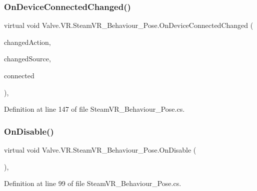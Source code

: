 \subsubsection{\texorpdfstring{OnDeviceConnectedChanged()}{OnDeviceConnectedChanged()}}
{\footnotesize\ttfamily virtual void Valve.\+V\+R.\+Steam\+V\+R\+\_\+\+Behaviour\+\_\+\+Pose.\+On\+Device\+Connected\+Changed (\begin{DoxyParamCaption}\item[{\mbox{\hyperlink{class_valve_1_1_v_r_1_1_steam_v_r___action___pose}{Steam\+V\+R\+\_\+\+Action\+\_\+\+Pose}}}]{changed\+Action,  }\item[{\mbox{\hyperlink{namespace_valve_1_1_v_r_a82e5bf501cc3aa155444ee3f0662853f}{Steam\+V\+R\+\_\+\+Input\+\_\+\+Sources}}}]{changed\+Source,  }\item[{bool}]{connected }\end{DoxyParamCaption})\hspace{0.3cm}{\ttfamily [protected]}, {\ttfamily [virtual]}}



Definition at line 147 of file Steam\+V\+R\+\_\+\+Behaviour\+\_\+\+Pose.\+cs.

\mbox{\label{class_valve_1_1_v_r_1_1_steam_v_r___behaviour___pose_afa7656935133f0cc8a07ddcba75eef42}} 
\subsubsection{\texorpdfstring{OnDisable()}{OnDisable()}}
{\footnotesize\ttfamily virtual void Valve.\+V\+R.\+Steam\+V\+R\+\_\+\+Behaviour\+\_\+\+Pose.\+On\+Disable (\begin{DoxyParamCaption}{ }\end{DoxyParamCaption})\hspace{0.3cm}{\ttfamily [protected]}, {\ttfamily [virtual]}}



Definition at line 99 of file Steam\+V\+R\+\_\+\+Behaviour\+\_\+\+Pose.\+cs.

\mbox{\label{class_valve_1_1_v_r_1_1_steam_v_r___behaviour___pose_acab997c4e82da2873b6462214a4ca96f}} 

